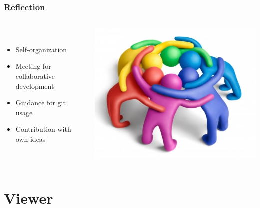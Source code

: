 \begin{frame}
  \frametitle{Reflection}
  \begin{columns}
  	\begin{column}{0.8\textwidth}
  \begin{description}[]
    \item[Bachelor students team] \hfill \\
      \begin{itemize}
        \item Self-organization
        \item Meeting for collaborative development
        \item Guidance for git usage
        \item Contribution with own ideas
      \end{itemize}
  \end{description} 
    \end{column}
    \begin{column}{0.2\textwidth}
   	  \includegraphics[width=\textwidth]{images/team}
    \end{column}
  \end{columns}
\end{frame}

\section{Viewer}

